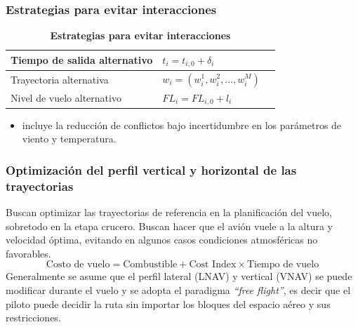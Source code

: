 \begin{frame}
    \frametitle{Estrategias para evitar interacciones}
    \begin{table}[h!]
        \centering
        \def\arraystretch{1.5}
        \caption*{\textbf{Estrategias para evitar interacciones}}
        \begin{tabular}{|llc|}
            \hline
            Tiempo de salida alternativo & $t_i = t_{i,0} + \delta_i$                          & \\ \hline
            Trayectoria alternativa      & $w_i = \left(w_i^{1},w_i^{2},\ldots,w_i^{M}\right)$ & \\ \hline
            Nivel de vuelo alternativo   & $FL_i = FL_{i,0} + l_i$                             & \\ \hline
        \end{tabular}
    \end{table}
    \begin{itemize}
        \item \cite{courchelle_simulated_2019} incluye la reducción de conflictos bajo incertidumbre en los parámetros de viento y temperatura.
    \end{itemize}
\end{frame}

\begin{frame}
    \frametitle{Optimización del perfil vertical y horizontal de las trayectorias}
    Buscan optimizar las trayectorias de referencia en la planificación del vuelo, sobretodo en la etapa crucero. Buscan hacer que el avión vuele a la altura y velocidad óptima, evitando en algunos casos condiciones atmosféricas no favorables.\\
    $$\text{Costo de vuelo} = \text{Combustible} + \text{Cost Index} \times \text{Tiempo de vuelo}$$
    Generalmente se asume que el perfil lateral (LNAV) y vertical (VNAV) se puede modificar durante el vuelo y se adopta el paradigma \textit{``free flight''}, es decir que el piloto puede decidir la ruta sin importar los bloques del espacio aéreo y sus restricciones.
\end{frame}

